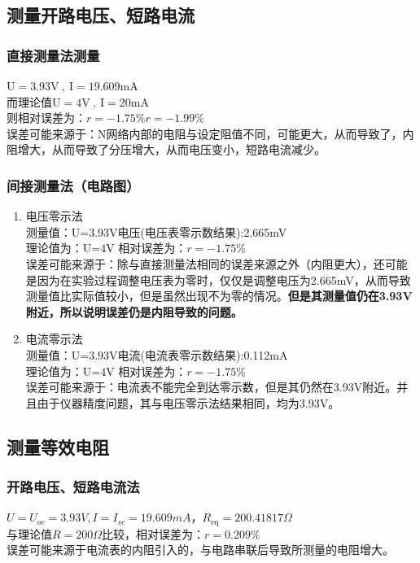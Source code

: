 \documentclass[dvipsnames, svgnames,a4paper,11pt]{article}
\begin{document}
	\subsection{测量开路电压、短路电流}
	
	\subsubsection{直接测量法测量}
	$\mathrm{U=3.93V~,~I=19.609mA}$\\
	\indent 而理论值$\mathrm{U=4V~,~I=20mA}$\\
	\indent 则相对误差为：$r=-1.75\%$\quad$r=-1.99\%$ \\
	\indent 误差可能来源于：N网络内部的电阻与设定阻值不同，可能更大，从而导致了，内阻增大，从而导致了分压增大，从而电压变小，短路电流减少。
	\subsubsection{间接测量法（电路图）}
	\begin{enumerate}
		\item 电压零示法\\
		测量值：$\text{U=3.93V}$\quad 电压(电压表零示数结果):2.665mV \\
		理论值为：$\text{U=4V}$
		\quad 相对误差为：$r=-1.75\%$\\
		误差可能来源于：除与直接测量法相同的误差来源之外（内阻更大），还可能是因为在实验过程调整电压表为零时，仅仅是调整电压为2.665mV，从而导致测量值比实际值较小，但是虽然出现不为零的情况。\textbf{但是其测量值仍在3.93V附近，所以说明误差仍是内阻导致的问题。}
		\item 电流零示法\\
		测量值：$\text{U=3.93V}$\quad 电流(电流表零示数结果):0.112mA \\
		理论值为：$\text{U=4V}$
		\quad 相对误差为：$r=-1.75\%$\\
		误差可能来源于：电流表不能完全到达零示数，但是其仍然在3.93V附近。并且由于仪器精度问题，其与电压零示法结果相同，均为3.93V。
	\end{enumerate}
	
	\subsection{测量等效电阻}
	
		\subsubsection{开路电压、短路电流法}
	 $U=U_{oc}=3.93V,I=I_{sc}=19.609mA$，$R_{\mathrm{eq}}=200. 41817 \Omega $\\
	 \indent 与理论值$R=200 \Omega $比较，相对误差为：$r=0.209\%$\\\indent 
	 误差可能来源于电流表的内阻引入的，与电路串联后导致所测量的电阻增大。
\end{document}
